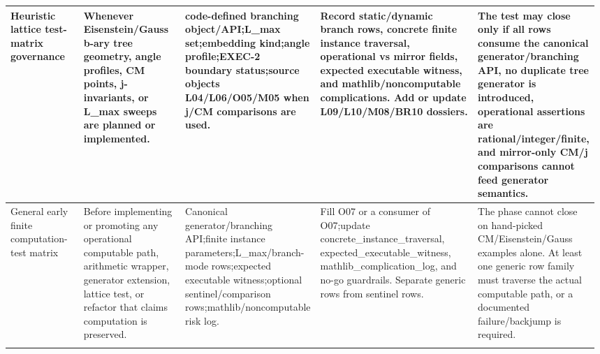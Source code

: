 \begin{longtable}{L{0.14\linewidth} L{0.19\linewidth} L{0.18\linewidth} L{0.31\linewidth} L{0.16\linewidth}}
Heuristic lattice test-matrix governance & Whenever Eisenstein/\allowbreak{}Gauss b-ary tree geometry, angle profiles, CM points, j-invariants, or L\_max sweeps are planned or implemented. & code-defined branching object/\allowbreak{}API;\newline L\_max set;\newline embedding kind;\newline angle profile;\newline EXEC-2 boundary status;\newline source objects L04/\allowbreak{}L06/\allowbreak{}O05/\allowbreak{}M05 when j/\allowbreak{}CM comparisons are used. & Record static/\allowbreak{}dynamic branch rows, concrete finite instance traversal, operational vs mirror fields, expected executable witness, and mathlib/\allowbreak{}noncomputable complications. Add or update L09/\allowbreak{}L10/\allowbreak{}M08/\allowbreak{}BR10 dossiers. & The test may close only if all rows consume the canonical generator/\allowbreak{}branching API, no duplicate tree generator is introduced, operational assertions are rational/\allowbreak{}integer/\allowbreak{}finite, and mirror-only CM/\allowbreak{}j comparisons cannot feed generator semantics.\\
\hline
\addlinespace[0.24em]
General early finite computation-test matrix & Before implementing or promoting any operational computable path, arithmetic wrapper, generator extension, lattice test, or refactor that claims computation is preserved. & Canonical generator/\allowbreak{}branching API;\newline finite instance parameters;\newline L\_max/\allowbreak{}branch-mode rows;\newline expected executable witness;\newline optional sentinel/\allowbreak{}comparison rows;\newline mathlib/\allowbreak{}noncomputable risk log. & Fill O07 or a consumer of O07;\newline update concrete\_instance\_traversal, expected\_executable\_witness, mathlib\_complication\_log, and no-go guardrails. Separate generic rows from sentinel rows. & The phase cannot close on hand-picked CM/\allowbreak{}Eisenstein/\allowbreak{}Gauss examples alone. At least one generic row family must traverse the actual computable path, or a documented failure/\allowbreak{}backjump is required.\\
\hline
\addlinespace[0.24em]

\end{longtable}
